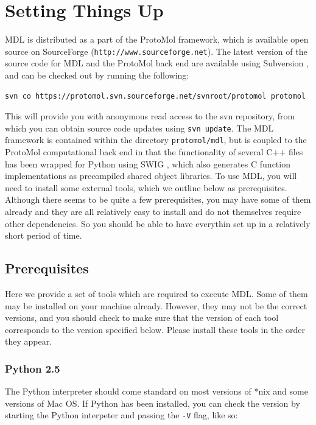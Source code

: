 \documentclass[11pt]{report}
\begin{document}
\chapter{Setting Things Up}

MDL is distributed as a part of the ProtoMol framework, which is available
open source on SourceForge (\texttt{http://www.sourceforge.net}).  The latest
version of the source code for MDL and the ProtoMol back end are available
using Subversion \cite{SUBV07}, and can be checked out by running the
following:

\begin{verbatim}
svn co https://protomol.svn.sourceforge.net/svnroot/protomol protomol
\end{verbatim}

This will provide you with anonymous read access to the svn repository,
from which you can obtain source code updates using \texttt{svn update}.
The MDL framework is contained within the directory \texttt{protomol/mdl},
but is coupled to the ProtoMol computational back end in that the
functionality of several C++ files has been wrapped for Python using
SWIG \cite{Beaz96}, which also generates C function implementations
as precompiled shared object libraries.  To use MDL, you will need 
to install some external tools, which we outline below as prerequisites.
Although there seems to be quite a few prerequisites, you may have some
of them already and they are all relatively easy to install and do
not themselves require other dependencies.  So you should be able
to have everythin set up in a relatively short period of time.

\section{Prerequisites}

Here we provide a set of tools which are required to execute MDL.
Some of them may be installed on your machine already.  However,
they may not be the correct versions, and you should check to make
sure that the version of each tool corresponds to the version
specified below.  Please install these tools in the order they
appear.

\subsection{Python 2.5}

The Python interpreter should come standard on most versions of *nix
and some versions of Mac OS.  If Python has been installed, you can
check the version by starting the Python interpeter and passing
the \texttt{-V} flag, like so:
\end{document}
